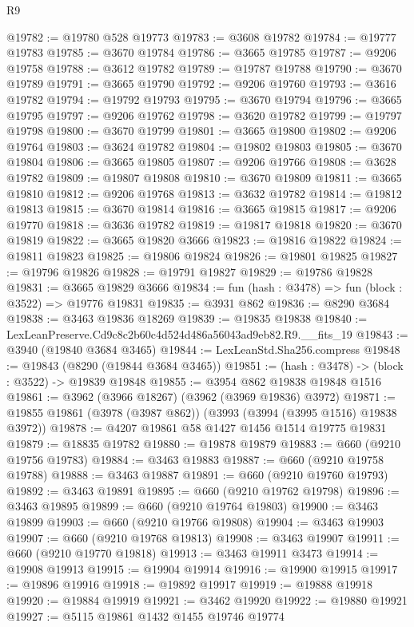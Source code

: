 \begin{lexlean}{R9}
\begin{coremodule}
@19782 := @19780 @528 @19773
@19783 := @3608 @19782
@19784 := @19777 @19783
@19785 := @3670 @19784
@19786 := @3665 @19785
@19787 := @9206 @19758
@19788 := @3612 @19782
@19789 := @19787 @19788
@19790 := @3670 @19789
@19791 := @3665 @19790
@19792 := @9206 @19760
@19793 := @3616 @19782
@19794 := @19792 @19793
@19795 := @3670 @19794
@19796 := @3665 @19795
@19797 := @9206 @19762
@19798 := @3620 @19782
@19799 := @19797 @19798
@19800 := @3670 @19799
@19801 := @3665 @19800
@19802 := @9206 @19764
@19803 := @3624 @19782
@19804 := @19802 @19803
@19805 := @3670 @19804
@19806 := @3665 @19805
@19807 := @9206 @19766
@19808 := @3628 @19782
@19809 := @19807 @19808
@19810 := @3670 @19809
@19811 := @3665 @19810
@19812 := @9206 @19768
@19813 := @3632 @19782
@19814 := @19812 @19813
@19815 := @3670 @19814
@19816 := @3665 @19815
@19817 := @9206 @19770
@19818 := @3636 @19782
@19819 := @19817 @19818
@19820 := @3670 @19819
@19822 := @3665 @19820 @3666
@19823 := @19816 @19822
@19824 := @19811 @19823
@19825 := @19806 @19824
@19826 := @19801 @19825
@19827 := @19796 @19826
@19828 := @19791 @19827
@19829 := @19786 @19828
@19831 := @3665 @19829 @3666
@19834 := fun (hash : @3478) => fun (block : @3522) => @19776 @19831
@19835 := @3931 @862
@19836 := @8290 @3684
@19838 := @3463 @19836 @18269
@19839 := @19835 @19838
@19840 := LexLeanPreserve.Cd9c8c2b60c4d524d486a56043ad9eb82.R9.__fits_19
@19843 := @3940 (@19840 @3684 @3465)
@19844 := LexLeanStd.Sha256.compress
@19848 := @19843 (@8290 (@19844 @3684 @3465))
@19851 := (hash : @3478) -> (block : @3522) -> @19839 @19848
@19855 := @3954 @862 @19838 @19848 @1516
@19861 := @3962 (@3966 @18267) (@3962 (@3969 @19836) @3972)
@19871 := @19855 @19861 (@3978 (@3987 @862)) (@3993 (@3994 (@3995 @1516) @19838 @3972))
@19878 := @4207 @19861 @58 @1427 @1456 @1514 @19775 @19831
@19879 := @18835 @19782
@19880 := @19878 @19879
@19883 := @660 (@9210 @19756 @19783)
@19884 := @3463 @19883
@19887 := @660 (@9210 @19758 @19788)
@19888 := @3463 @19887
@19891 := @660 (@9210 @19760 @19793)
@19892 := @3463 @19891
@19895 := @660 (@9210 @19762 @19798)
@19896 := @3463 @19895
@19899 := @660 (@9210 @19764 @19803)
@19900 := @3463 @19899
@19903 := @660 (@9210 @19766 @19808)
@19904 := @3463 @19903
@19907 := @660 (@9210 @19768 @19813)
@19908 := @3463 @19907
@19911 := @660 (@9210 @19770 @19818)
@19913 := @3463 @19911 @3473
@19914 := @19908 @19913
@19915 := @19904 @19914
@19916 := @19900 @19915
@19917 := @19896 @19916
@19918 := @19892 @19917
@19919 := @19888 @19918
@19920 := @19884 @19919
@19921 := @3462 @19920
@19922 := @19880 @19921
@19927 := @5115 @19861 @1432 @1455 @19746 @19774

\end{coremodule}
\end{lexlean}
